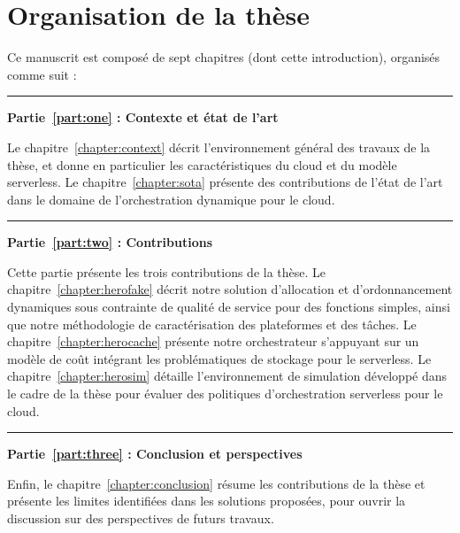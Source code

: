 \clearpage

\section{Organisation de la thèse}

Ce manuscrit est composé de sept chapitres (dont cette introduction), organisés comme suit :

\begin{center}
    \rule{4cm}{0.4pt}
\end{center}

\textbf{Partie~\ref{part:one} : Contexte et état de l'art}

Le chapitre~\ref{chapter:context} décrit l'environnement général des travaux de la thèse, et donne en particulier les caractéristiques du cloud et du modèle serverless. Le chapitre~\ref{chapter:sota} présente des contributions de l'état de l'art dans le domaine de l'orchestration dynamique pour le cloud.

\begin{center}
    \rule{4cm}{0.4pt}
\end{center}

\textbf{Partie~\ref{part:two} : Contributions}

Cette partie présente les trois contributions de la thèse. Le chapitre~\ref{chapter:herofake} décrit notre solution d'allocation et d'ordonnancement dynamiques sous contrainte de qualité de service pour des fonctions simples, ainsi que notre méthodologie de caractérisation des plateformes et des tâches. Le chapitre~\ref{chapter:herocache} présente notre orchestrateur s'appuyant sur un modèle de coût intégrant les problématiques de stockage pour le serverless. Le chapitre~\ref{chapter:herosim} détaille l'environnement de simulation développé dans le cadre de la thèse pour évaluer des politiques d'orchestration serverless pour le cloud.

\begin{center}
    \rule{4cm}{0.4pt}
\end{center}

\textbf{Partie~\ref{part:three} : Conclusion et perspectives}

Enfin, le chapitre~\ref{chapter:conclusion} résume les contributions de la thèse et présente les limites identifiées dans les solutions proposées, pour ouvrir la discussion sur des perspectives de futurs travaux.
